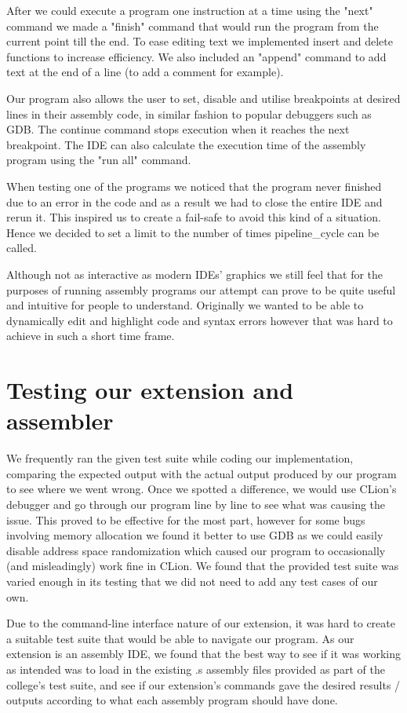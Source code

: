 \documentclass[11pt]{article}
\begin{document}
After we could execute a program one instruction at a time using the "next" command we made a "finish" command that would run the program from the current point till the end. To ease editing text we implemented insert and delete functions to increase efficiency. We also included an "append" command to add text at the end of a line (to add a comment for example). 

Our program also allows the user to set, disable and utilise breakpoints at desired lines in their assembly code, in similar fashion to popular debuggers such as GDB. The continue command stops execution when it reaches the next breakpoint. The IDE can also calculate the execution time of the assembly program using the "run all" command.

When testing one of the programs we noticed that the program never finished due to an error in the code and as a result we had to close the entire IDE and rerun it. This inspired us to create a fail-safe to avoid this kind of a situation. Hence we decided to set a limit to the number of times pipeline\_cycle can be called.
 
Although not as interactive as modern IDEs' graphics we still feel that for the purposes of running assembly programs our attempt can prove to be quite useful and intuitive for people to understand.
Originally we wanted to be able to dynamically edit and highlight code and syntax errors however that was hard to achieve in such a short time frame. 


\section*{Testing our extension and assembler}
We frequently ran the given test suite while coding our implementation, comparing the expected output with the actual output produced by our program to see where we went wrong. Once we spotted a difference, we would use CLion's debugger and go through our program line by line to see what was causing the issue. This proved to be effective for the most part, however for some bugs involving memory allocation we found it better to use GDB as we could easily disable address space randomization which caused our program to occasionally (and misleadingly) work fine in CLion. We found that the provided test suite was varied enough in its testing that we did not need to add any test cases of our own.

Due to the command-line interface nature of our extension, it was hard to create a suitable test suite that would be able to navigate our program. As our extension is an assembly IDE, we found that the best way to see if it was working as intended was to load in the existing .s assembly files provided as part of the college's test suite, and see if our extension's commands gave the desired results / outputs according to what each assembly program should have done.
\end{document}
